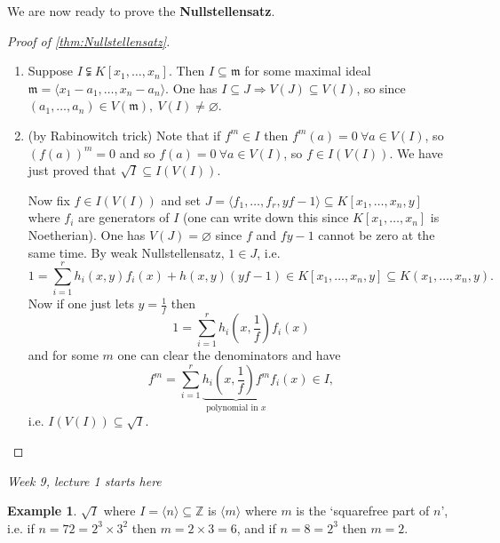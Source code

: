 \documentclass[a4paper]{article}
\newcommand{\la}{\langle}
\newcommand{\ra}{\rangle}
\newcommand{\Z}{\mathbb Z}
\newcommand{\m}{\mathfrak m}
\theoremstyle{definition}
\newtheorem{example}[defn]{Example}
\begin{document}
We are now ready to prove the \textbf{Nullstellensatz}.
\begin{proof}[Proof of \ref{thm:Nullstellensatz}]
\begin{enumerate}
\item Suppose $I\subsetneqq K[x_1,\ldots,x_n]$. Then $I\subseteq \m$ for some maximal ideal $\m=\la x_1-a_1,\ldots,x_n-a_n\ra$. One has $I\subseteq J\Rightarrow V(J)\subseteq V(I)$, so since $(a_1,\ldots,a_n)\in V(\m),\ V(I)\neq\varnothing$.
\item (by Rabinowitch trick) Note that if $f^m\in I$ then $f^m(a)=0 \ \forall a\in V(I)$, so $(f(a))^m=0$ and so $f(a)=0 \ \forall a\in V(I)$, so $f\in I(V(I))$. We have just proved that $\sqrt I\subseteq I(V(I))$.

Now fix $f\in I(V(I))$ and set $J=\la f_1,\ldots,f_r, yf-1\ra\subseteq K[x_1,\ldots,x_n,y]$ where $f_i$ are generators of $I$ (one can write down this since $K[x_1,\ldots,x_n]$ is Noetherian). One has $V(J)=\varnothing$ since $f$ and $fy-1$ cannot be zero at the same time. By weak Nullstellensatz, $1\in J$, i.e.
\[
1=\sum_{i=1}^r h_i(x,y)f_i(x) + h(x,y)(yf-1)\in K[x_1,\ldots,x_n,y]\subseteq K(x_1,\ldots,x_n,y).
\]
Now if one just lets $y=\frac{1}{f}$ then
\[
1=\sum_{i=1}^r h_i\left(x,\frac1f\right) f_i(x)
\]
and for some $m$ one can clear the denominators and have
\[
f^m=\sum_{i=1}^r \underbrace{h_i\left(x,\frac1f\right)f^m}_{\text{polynomial in }x} f_i(x) \in I,
\]
i.e. $I(V(I))\subseteq \sqrt I$.
\end{enumerate}
\end{proof}

\begin{flushright}
\textit{Week 9, lecture 1 starts here}
\end{flushright}

\begin{example}
$\sqrt I$ where $I=\la n\ra\subseteq\Z$ is $\la m\ra$ where $m$ is the `squarefree part of $n$', i.e. if $n=72=2^3\times 3^2$ then $m=2\times 3=6$, and if $n=8=2^3$ then $m=2$.
\end{example}
\end{document}
